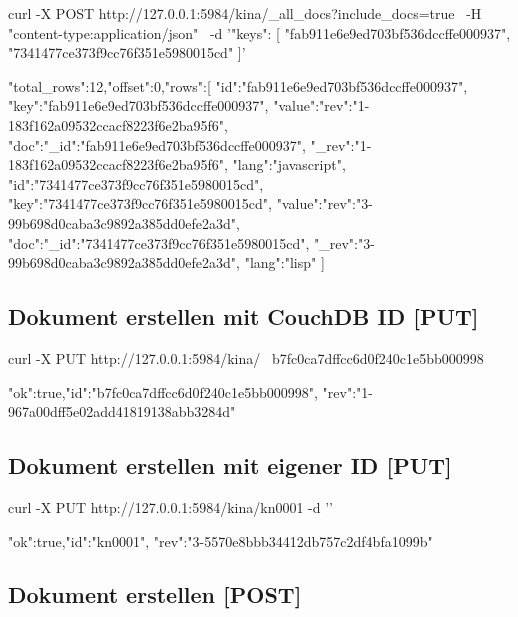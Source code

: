 \documentclass[19pt,landscape,twocolumn]{article}
\newcommand{\htmlverb}[1]{{[}\textbf{{#1}}{]}}
\newcommand{\setparskip}{\setlength{\parskip}{-6mm}}
\newcommand{\resetparskip}{\setlength{\parskip}{1mm}}
\begin{document}
\begin{code}
curl -X POST http://127.0.0.1:5984/kina/_all_docs?include_docs=true \
  -H "content-type:application/json" \
  -d '{"keys": [
        "fab911e6e9ed703bf536dccffe000937",
        "7341477ce373f9cc76f351e5980015cd"
      ]}'
\end{code}
\setparskip
\begin{response}
{"total_rows":12,"offset":0,"rows":[
  {"id":"fab911e6e9ed703bf536dccffe000937",
   "key":"fab911e6e9ed703bf536dccffe000937",
   "value":{"rev":"1-183f162a09532ccacf8223f6e2ba95f6"},
   "doc":{"_id":"fab911e6e9ed703bf536dccffe000937",
   "_rev":"1-183f162a09532ccacf8223f6e2ba95f6",
   "lang":"javascript"}},
  {"id":"7341477ce373f9cc76f351e5980015cd",
   "key":"7341477ce373f9cc76f351e5980015cd",
   "value":{"rev":"3-99b698d0caba3c9892a385dd0efe2a3d"},
   "doc":{"_id":"7341477ce373f9cc76f351e5980015cd",
   "_rev":"3-99b698d0caba3c9892a385dd0efe2a3d",
   "lang":"lisp"}}
]}
\end{response}
\resetparskip

\subsection{Dokument erstellen mit CouchDB ID \htmlverb{PUT}}

\begin{code}
curl -X PUT http://127.0.0.1:5984/kina/ \
  b7fc0ca7dffcc6d0f240c1e5bb000998
\end{code}
\setparskip
\begin{response}
{"ok":true,"id":"b7fc0ca7dffcc6d0f240c1e5bb000998",
 "rev":"1-967a00dff5e02add41819138abb3284d"}
\end{response}
\resetparskip

\subsection{Dokument erstellen mit eigener ID \htmlverb{PUT}}

\begin{code}
curl -X PUT http://127.0.0.1:5984/kina/kn0001 -d '{}'
\end{code}
\setparskip
\begin{response}
{"ok":true,"id":"kn0001",
 "rev":"3-5570e8bbb34412db757c2df4bfa1099b"}
\end{response}
\resetparskip

\subsection{Dokument erstellen \htmlverb{POST}}
\end{document}

